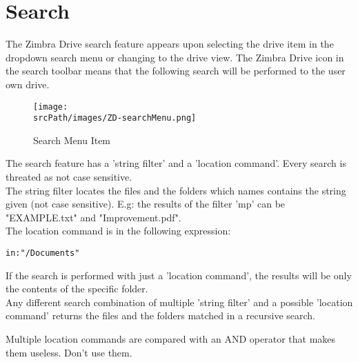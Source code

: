 \section{Search}
The Zimbra Drive search feature appears upon selecting the drive item in the dropdown search menu or changing to the drive view.
The Zimbra Drive icon in the search toolbar means that the following search will be performed to the user own drive.
\begin{figure}[htbp,!h] 
\centering 
\texttt{[image: \\srcPath/images/ZD-searchMenu.png]} 
\caption{Search Menu Item} 
\label{fig:searchMenu}
\end{figure}

The search feature has a 'string filter' and a 'location command'. 
Every search is threated as not case sensitive. \\
The string filter locates the files and the folders which names contains the string given (not case sensitive).
E.g: the results of the filter 'mp' can be "EXAMPLE.txt" and "Improvement.pdf".\\

The location command is in the following expression:
\begin{verbatim}
in:"/Documents"
\end{verbatim}
If the search is performed with just a 'location command', the results will be only the contents of the specific folder.\\

Any different search combination of multiple 'string filter' and a possible 'location command' returns 
the files and the folders matched in a recursive search.

\begin{warning}
    Multiple location commands are compared with an AND operator that makes them useless. Don't use them.
\end{warning}
